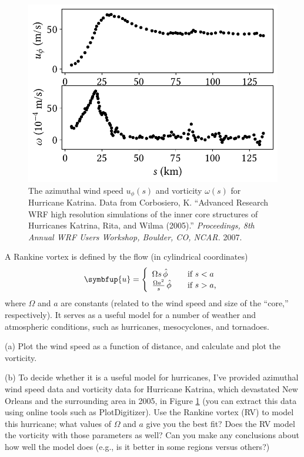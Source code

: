 \begin{problem}

\begin{figure}
\centering\includegraphics[width=0.8\linewidth]{Figures/Chapter3/fig_hurricane_data}
\caption{The azimuthal wind speed $u_\phi(s)$ and vorticity $\omega(s)$ for Hurricane Katrina.  Data from Corbosiero, K. ``Advanced Research WRF high resolution simulations of the inner core structures of Hurricanes Katrina, Rita, and Wilma (2005).'' \emph{Proceedings, 8th Annual WRF Users Workshop, Boulder, CO, NCAR.} 2007.}
\label{fig_hurricane_data}
\end{figure}

A Rankine vortex is defined by the flow (in cylindrical coordinates)
\[
\symbfup{u}  = \left\{
 \begin{array}{l l}
    \Omega s \, \hat{\phi} & \quad \text{if $s < a$}\\
   \frac{\Omega a^2}{s} \, \hat{\phi} & \quad \text{if $s>a$,}
  \end{array} \right.
\]
where $\Omega$ and $a$ are constants (related to the wind speed and size of the ``core,'' respectively).  It serves as a useful model for a number of weather and atmospheric conditions, such as hurricanes, mesocyclones, and tornadoes.  

(a) Plot the wind speed as a function of distance, and calculate and plot the vorticity.

(b) To decide whether it is a useful model for hurricanes, I've provided azimuthal wind speed data and vorticity data for Hurricane Katrina, which devastated New Orleans and the surrounding area in 2005, in Figure \ref{fig_hurricane_data} (you can extract this data using online tools such as PlotDigitizer). Use the Rankine vortex (RV) to model this hurricane; what values of $\Omega$ and $a$ give you the best fit?  Does the RV model the vorticity with those parameters as well?  Can you make any conclusions about how well the model does (e.g., is it better in some regions versus others?)


\end{problem}
